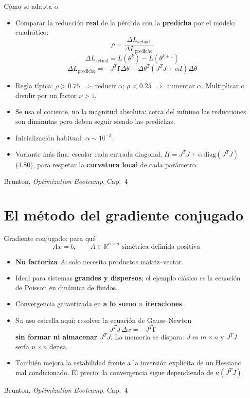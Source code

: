 \documentclass[10pt,aspectratio=169]{beamer}
\newcommand{\fuente}{\vfill{\scriptsize\color{gray}Brunton, \emph{Optimization Bootcamp}, Cap.~4}}
\newcommand{\R}{\mathbb{R}}
\begin{document}
\begin{frame}{Cómo se adapta $\alpha$}
  \small
  \begin{itemize}
    \item Comparar la reducción \textbf{real} de la pérdida con la
      \textbf{predicha} por el modelo cuadrático:
      \[
        \rho = \frac{\Delta L_{\text{actual}}}{\Delta L_{\text{predicho}}}
        \tag{4.76}
      \]
      \[
        \Delta L_{\text{actual}} = L(\theta^k)-L(\theta^{k+1}) \tag{4.77}
      \]
      \[
        \Delta L_{\text{predicho}}
        = -J^T\mathbf{f}\,\Delta\theta
          - \Delta\theta^T(J^TJ+\alpha I)\Delta\theta \tag{4.78}
      \]
    \item Regla típica: $\rho > 0.75$ $\Rightarrow$ reducir $\alpha$;
      $\rho < 0.25$ $\Rightarrow$ aumentar $\alpha$.
      Multiplicar o dividir por un factor $\nu > 1$.
    \item Se usa el cociente, no la magnitud absoluta: cerca del mínimo las
      reducciones son diminutas pero deben seguir siendo las predichas.
    \item Inicialización habitual: $\alpha \sim 10^{-3}$.
    \item Variante más fina: escalar cada entrada diagonal,
      $H = J^TJ + \alpha\,\mathrm{diag}(J^TJ)$ (4.80), para respetar la
      \textbf{curvatura local} de cada parámetro.
  \end{itemize}
  \fuente
\end{frame}

\section{El método del gradiente conjugado}

\begin{frame}{Gradiente conjugado: para qué}
  \small
  \[
    Ax = b, \qquad A \in \R^{n\times n} \text{ simétrica definida positiva}
    \tag{4.81}
  \]
  \begin{itemize}
    \item \textbf{No factoriza $A$}: solo necesita productos matriz--vector.
    \item Ideal para sistemas \textbf{grandes y dispersos}; el ejemplo clásico es
      la ecuación de Poisson en dinámica de fluidos.
    \item Convergencia garantizada en \textbf{a lo sumo $n$ iteraciones}.
    \item Su uso estrella aquí: resolver la ecuación de Gauss--Newton
      \[
        J^TJ\,\Delta x = -J^T\mathbf{f} \tag{4.82}
      \]
      \textbf{sin formar ni almacenar $J^TJ$}. La memoria se dispara:
      $J$ es $m\times n$ y $J^TJ$ sería $n\times n$ densa.
    \item También mejora la estabilidad frente a la inversión explícita de un
      Hessiano mal condicionado. El precio: la convergencia sigue dependiendo
      de $\kappa(J^TJ)$.
  \end{itemize}
  \fuente
\end{frame}
\end{document}
